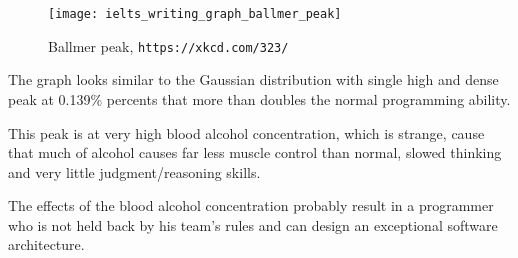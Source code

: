 \begin{figure}[H]
  \centering
    \texttt{[image: ielts\_writing\_graph\_ballmer\_peak]}
  \caption{Ballmer peak, \texttt{https://xkcd.com/323/}}
  \label{fig:ielts_writing_graph_ballmer_peak}
\end{figure}

\begin{answer}
The graph looks similar to the Gaussian distribution with single high and dense peak at 0.139\% percents that more than doubles the normal programming ability.  

This peak is at very high blood alcohol concentration, which is strange, cause that much of alcohol causes far less muscle control than normal, slowed thinking and very little judgment/reasoning skills. 

The effects of the blood alcohol concentration probably result in a programmer who is not held back by his team's rules and can design an exceptional software architecture.
\end{answer}
